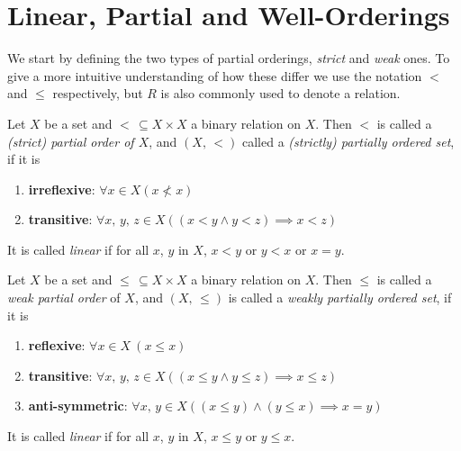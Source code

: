\documentclass[../../main.tex]{subfiles}
\begin{document}
\section{Linear, Partial and Well-Orderings}
We start by defining the two types of partial orderings, \textit{strict} and \textit{weak} ones.
To give a more intuitive understanding of how these differ we use the notation $<$ and $\leq$ respectively, but $R$ is also commonly used to denote a relation.

\begin{definition}\cite[p.165]{Gol17}
    Let $X$ be a set and $<\, \subseteq X \times X$ a binary relation on $X$.
    Then $<$ is called a \textit{(strict) partial order of $X$}, and $(X,\, <)$ called a \textit{(strictly) partially ordered set}, if it is
    \begin{enumerate}[label=(\roman*)]
        \item \textbf{irreflexive}: $\forall x \in X \left(x \not < x\right)$
        \item \textbf{transitive}: $\forall x,\, y,\, z \in X \left(\left(x < y \wedge y < z\right) \implies x < z\right)$
    \end{enumerate}
    It is called \textit{linear} if for all $x$, $y$ in $X$, $x < y$ or $y < x$ or $x = y$.
\end{definition}

\begin{definition}\cite[p.164]{Gol17}
    Let $X$ be a set and $\leq\, \subseteq X \times X$ a binary relation on $X$.
    Then $\leq$ is called a \textit{weak partial order} of $X$, and $(X,\, \leq)$ is called a \textit{weakly partially ordered set}, if it is
    \begin{enumerate}[label=(\roman*)]
        \item \textbf{reflexive}: $\forall x \in X \ (x \leq x)$
        \item \textbf{transitive}: $\forall x,\, y,\, z \in X \left(\left(x \leq y \wedge y \leq z\right) \implies x \leq z\right)$
        \item \textbf{anti-symmetric}: $\forall x,\, y \in X \left((x \leq y) \wedge (y \leq x) \implies x = y\right)$
    \end{enumerate} 
    It is called \textit{linear} if for all $x$, $y$ in $X$, $x \leq y$ or $y \leq x$.
\end{definition}
\end{document}
